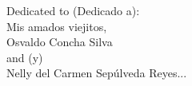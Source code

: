 \documentclass[]{book}
\begin{document}
\clearpage
\thispagestyle{empty}
\phantom{a}
\vfill

\begin{dedication}

\centering
Dedicated to (Dedicado a):\\
\vspace{7cm}
Mis amados viejitos,\\ Osvaldo Concha Silva\\ and (y) \\ Nelly del Carmen Sep\'ulveda Reyes...

\end{dedication}

\tableofcontents

\listoffigures

\listoftables


\printglossaries


% 









\printindex
{} %
\thispagestyle{fancy}

%
%





\listoftodos
\end{document}
